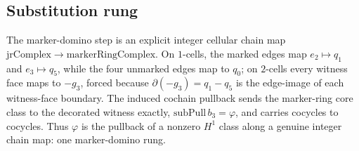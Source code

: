 \subsection{Substitution rung}

\begin{theorem}\label{thm:jeandel-rao-substitution}\leanok{}
The marker-domino step is an explicit integer cellular chain map
$\mathrm{jrComplex}\to\mathrm{markerRingComplex}$. On $1$-cells, the marked
edges map $e_2\mapsto q_1$ and $e_3\mapsto q_5$, while the four unmarked edges
map to $q_0$; on $2$-cells every witness face maps to $-g_3$, forced because
$\partial(-g_3)=q_1-q_5$ is the edge-image of each witness-face boundary. The
induced cochain pullback sends the marker-ring core class to the decorated
witness exactly, $\mathrm{subPull}\,b_3=\varphi$, and carries cocycles to
cocycles. Thus $\varphi$ is the pullback of a nonzero $H^1$ class along a
genuine integer chain map: one marker-domino rung.
\end{theorem}
